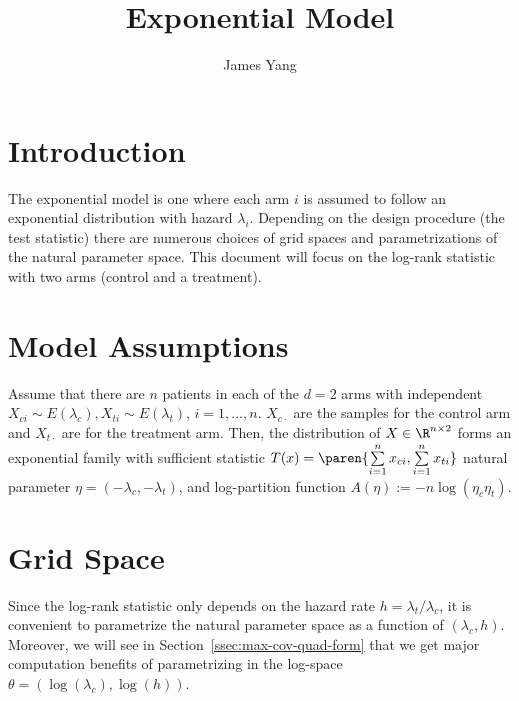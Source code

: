 \documentclass[10pt, a4paper]{article}
\begin{document}
\title{Exponential Model}
\author{James Yang}
\maketitle

\section{Introduction}

The exponential model is one where each arm $i$ is assumed to follow
an exponential distribution with hazard $\lambda_i$.
Depending on the design procedure (the test statistic)
there are numerous choices of grid spaces and parametrizations
of the natural parameter space.
This document will focus on the log-rank statistic with two arms 
(control and a treatment).

\section{Model Assumptions}\label{sec:model}

Assume that there are $n$ patients in each of the $d=2$ arms
with independent $X_{ci} \sim E(\lambda_c), X_{ti} \sim E(\lambda_t)$,
$i=1,\ldots, n$.
$X_{c\cdot}$ are the samples for the control arm and
$X_{t\cdot}$ are for the treatment arm.
Then, the distribution of $X \in \R^{n \times 2}$ forms an exponential family
with sufficient statistic $T(x) = \paren{\sum\limits_{i=1}^n x_{ci}, \sum\limits_{i=1}^n x_{ti}}$
natural parameter $\eta = (-\lambda_c, -\lambda_t)$,
and log-partition function $A(\eta) := -n\log(\eta_c \eta_t)$.

\section{Grid Space}

Since the log-rank statistic only depends on the hazard rate
$h = \lambda_t / \lambda_c$,
it is convenient to parametrize the natural parameter space
as a function of $(\lambda_c, h)$.
Moreover, we will see in Section~\ref{ssec:max-cov-quad-form}
that we get major computation benefits of parametrizing in the log-space
$\theta = (\log(\lambda_c), \log(h))$.
\end{document}
